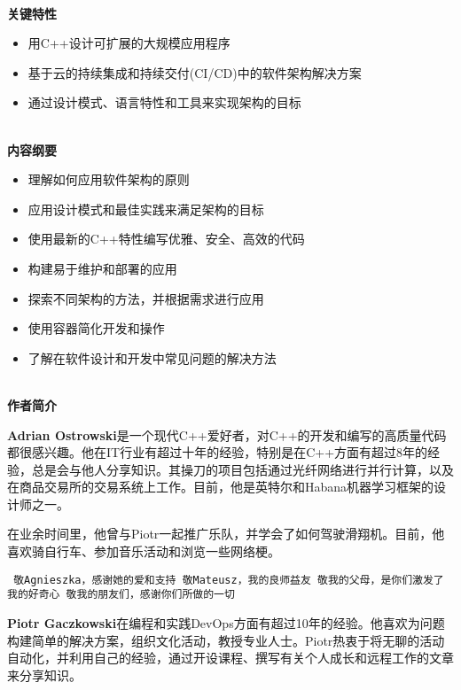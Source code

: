 \documentclass[11pt,a4paper,UTF8]{book}
\begin{document}
\begin{sloppypar}
	\hspace*{\fill} \\ %
	\noindent\textbf{关键特性}
	\begin{itemize}
		\item 用C++设计可扩展的大规模应用程序
		\item 基于云的持续集成和持续交付(CI/CD)中的软件架构解决方案
		\item 通过设计模式、语言特性和工具来实现架构的目标
	\end{itemize}
	
	\hspace*{\fill} \\ %
	\noindent\textbf{内容纲要}
	\begin{itemize}
		\item 理解如何应用软件架构的原则
		\item 应用设计模式和最佳实践来满足架构的目标
		\item 使用最新的C++特性编写优雅、安全、高效的代码
		\item 构建易于维护和部署的应用
		\item 探索不同架构的方法，并根据需求进行应用
		\item 使用容器简化开发和操作
		\item 了解在软件设计和开发中常见问题的解决方法
	\end{itemize}
	
	\hspace*{\fill} \\ %
	\noindent\textbf{作者简介}
	
	\textbf{Adrian Ostrowski}是一个现代C++爱好者，对C++的开发和编写的高质量代码都很感兴趣。他在IT行业有超过十年的经验，特别是在C++方面有超过8年的经验，总是会与他人分享知识。其操刀的项目包括通过光纤网络进行并行计算，以及在商品交易所的交易系统上工作。目前，他是英特尔和Habana机器学习框架的设计师之一。
	
	在业余时间里，他曾与Piotr一起推广乐队，并学会了如何驾驶滑翔机。目前，他喜欢骑自行车、参加音乐活动和浏览一些网络梗。
	
	\begin{center}
	\tt
	敬Agnieszka，感谢她的爱和支持
	敬Mateusz，我的良师益友
	敬我的父母，是你们激发了我的好奇心
	敬我的朋友们，感谢你们所做的一切
	\end{center}

	\textbf{Piotr Gaczkowski}在编程和实践DevOps方面有超过10年的经验。他喜欢为问题构建简单的解决方案，组织文化活动，教授专业人士。Piotr热衷于将无聊的活动自动化，并利用自己的经验，通过开设课程、撰写有关个人成长和远程工作的文章来分享知识。
	

\end{sloppypar}
\end{document}

